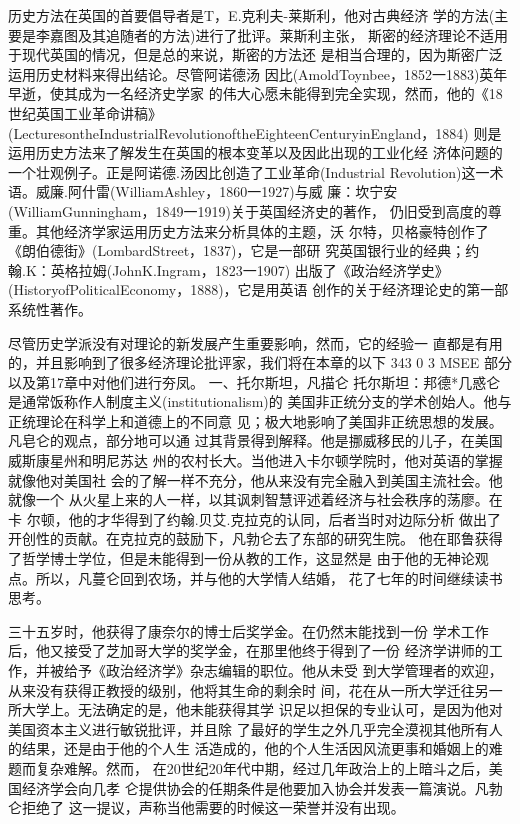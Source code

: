 历史方法在英国的首要倡导者是T，E.克利夫-莱斯利，他对古典经济
学的方法(主要是李嘉图及其追随者的方法)进行了批评。莱斯利主张，
斯密的经济理论不适用于现代英国的情况，但是总的来说，斯密的方法还
是相当合理的，因为斯密广泛运用历史材料来得出结论。尽管阿诺德汤
因比(AmoldToynbee，1852一1883)英年早逝，使其成为一名经济史学家
的伟大心愿未能得到完全实现，然而，他的《18世纪英国工业革命讲稿》
(LecturesontheIndustrialRevolutionoftheEighteenCenturyinEngland，1884)
则是运用历史方法来了解发生在英国的根本变革以及因此出现的工业化经
济体问题的一个壮观例子。正是阿诺德.汤因比创造了工业革命(Industrial
Revolution)这一术语。威廉.阿什雷(WilliamAshley，1860一1927)与威
廉：坎宁安(WilliamGunningham，1849一1919)关于英国经济史的著作，
仍旧受到高度的尊重。其他经济学家运用历史方法来分析具体的主题，沃
尔特，贝格豪特创作了《朗伯德街》(LombardStreet，1837)，它是一部研
究英国银行业的经典；约翰.K：英格拉姆(JohnK.Ingram，1823一1907)
出版了《政治经济学史》(HistoryofPoliticalEconomy，1888)，它是用英语
创作的关于经济理论史的第一部系统性著作。

尽管历史学派没有对理论的新发展产生重要影响，然而，它的经验一
直都是有用的，并且影响到了很多经济理论批评家，我们将在本章的以下
343
0
3
MSEE
部分以及第17章中对他们进行夯凤。
一、托尔斯坦，凡描仑
托尔斯坦：邦德*几惑仑是通常饭称作人制度主义(institutionalism)的
美国非正统分支的学术创始人。他与正统理论在科学上和道德上的不同意
见；极大地影响了美国非正统思想的发展。凡皂仑的观点，部分地可以通
过其背景得到解释。他是挪威移民的儿子，在美国威斯康星州和明尼苏达
州的农村长大。当他进入卡尔顿学院时，他对英语的掌握就像他对美国社
会的了解一样不充分，他从来没有完全融入到美国主流社会。他就像一个
从火星上来的人一样，以其讽刺智慧评述着经济与社会秩序的荡廖。在卡
尔顿，他的才华得到了约翰.贝艾.克拉克的认同，后者当时对边际分析
做出了开创性的贡献。在克拉克的鼓励下，凡勃仑去了东部的研究生院。
他在耶鲁获得了哲学博士学位，但是未能得到一份从教的工作，这显然是
由于他的无神论观点。所以，凡蔓仑回到农场，并与他的大学情人结婚，
花了七年的时间继续读书思考。

三十五岁时，他获得了康奈尔的博士后奖学金。在仍然末能找到一份
学术工作后，他又接受了芝加哥大学的奖学金，在那里他终于得到了一份
经济学讲师的工作，并被给予《政治经济学》杂志编辑的职位。他从未受
到大学管理者的欢迎，从来没有获得正教授的级别，他将其生命的剩余时
间，花在从一所大学迁往另一所大学上。无法确定的是，他未能获得其学
识足以担保的专业认可，是因为他对美国资本主义进行敏锐批评，并且除
了最好的学生之外几乎完全漠视其他所有人的结果，还是由于他的个人生
活造成的，他的个人生活因风流更事和婚姻上的难题而复杂难解。然而，
在20世纪20年代中期，经过几年政治上的上暗斗之后，美国经济学会向几孝
仑提供协会的任期条件是他要加入协会并发表一篇演说。凡勃仑拒绝了
这一提议，声称当他需要的时候这一荣誉并没有出现。

